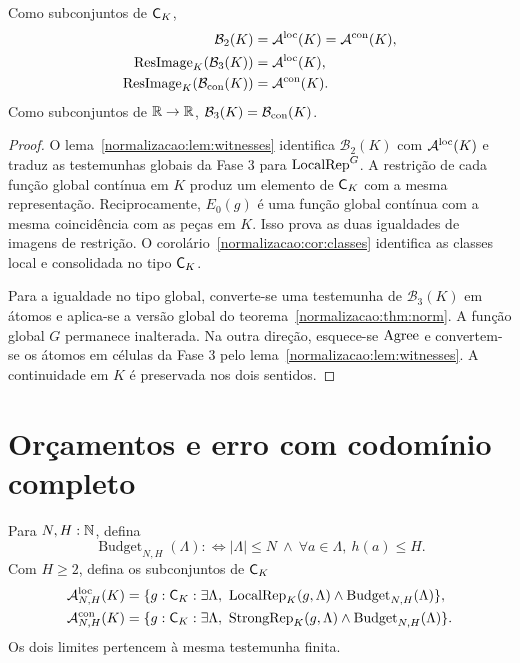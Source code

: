 \begin{teorema}\label{map:normalizacao:5.6}\label{normalizacao:thm:bridge}
Como subconjuntos de $\mathsf C_K$,
\begin{align*}
 \mathcal B_2(K)&=\mathcal A^{\mathrm{loc}}(K)=\mathcal A^{\mathrm{con}}(K),\\
 \operatorname{ResImage}_K(\mathcal B_3(K))&=\mathcal A^{\mathrm{loc}}(K),\\
 \operatorname{ResImage}_K(\mathcal B_{\rm con}(K))&=\mathcal A^{\mathrm{con}}(K).
\end{align*}
Como subconjuntos de $\mathbb R\to\mathbb R$,
$\mathcal B_3(K)=\mathcal B_{\rm con}(K)$.
\end{teorema}
\begin{proof}
O lema~\ref{normalizacao:lem:witnesses} identifica $\mathcal B_2(K)$ com
$\mathcal A^{\mathrm{loc}}(K)$ e traduz as testemunhas globais da Fase 3 para
$\operatorname{LocalRep}^G$. A restrição de cada função global contínua em
$K$ produz um elemento de $\mathsf C_K$ com a mesma representação.
Reciprocamente, $E_0(g)$ é uma função global contínua com a mesma
coincidência com as peças em $K$. Isso prova as duas igualdades
de imagens de restrição. O corolário~\ref{normalizacao:cor:classes} identifica
as classes local e consolidada no tipo $\mathsf C_K$.

Para a igualdade no tipo global, converte-se uma testemunha de
$\mathcal B_3(K)$ em átomos e aplica-se a versão global do
teorema~\ref{normalizacao:thm:norm}. A função global $G$ permanece inalterada. Na outra
direção, esquece-se $\operatorname{Agree}$ e convertem-se os átomos em células da
Fase 3 pelo lema~\ref{normalizacao:lem:witnesses}. A continuidade em $K$ é
preservada nos dois sentidos.
\end{proof}

\section{Orçamentos e erro com codomínio completo}
\label{normalizacao:sec:error}

\begin{definicao}\label{map:normalizacao:6.1}
Para $N,H:\mathbb N$, defina
\[
 \operatorname{Budget}_{N,H}(\Lambda):\Longleftrightarrow
 |\Lambda|\le N\ \land\ \forall a\in\Lambda,\ h(a)\le H.
\]
Com $H\ge2$, defina os subconjuntos de $\mathsf C_K$
\begin{align*}
 \mathcal A^{\mathrm{loc}}_{N,H}(K)&=\{g:\mathsf C_K:\exists\Lambda,\
       \operatorname{LocalRep}_K(g,\Lambda)\land\operatorname{Budget}_{N,H}(\Lambda)\},\\
 \mathcal A^{\mathrm{con}}_{N,H}(K)&=\{g:\mathsf C_K:\exists\Lambda,\
       \operatorname{StrongRep}_K(g,\Lambda)\land\operatorname{Budget}_{N,H}(\Lambda)\}.
\end{align*}
Os dois limites pertencem à mesma testemunha finita.
\end{definicao}

